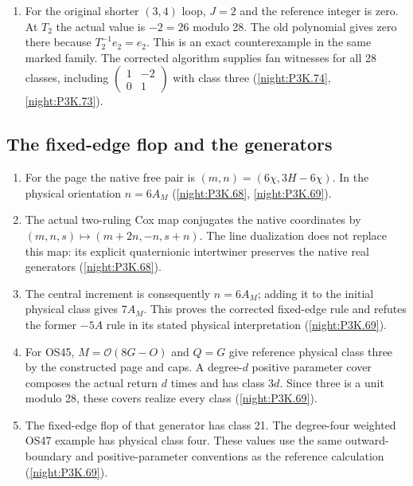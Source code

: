 \begin{enumerate}[label=\arabic*.]
  (\cref{night:P3K.73}).
\item For the original shorter $(3,4)$ loop, $J=2$ and the
  reference integer is zero.  At $T_2$ the actual value is $-2=26$
  modulo 28.  The old polynomial gives zero there because
  $T_2^{-1}e_2=e_2$.  This is an exact counterexample in the same
  marked family.  The corrected algorithm supplies fan witnesses
  for all 28 classes, including
  $\left(\begin{smallmatrix}1&-2\\0&1\end{smallmatrix}\right)$
  with class three (\cref{night:P3K.74}, \cref{night:P3K.73}).
\end{enumerate}

\subsection{The fixed-edge flop and the generators}
\RungOne
\begin{enumerate}[label=\arabic*.]
\item For the page the native free pair is
  $(m,n)=(6\chi,3H-6\chi)$.  In the physical orientation
  $n=6A_M$ (\cref{night:P3K.68}, \cref{night:P3K.69}).
\item The actual two-ruling Cox map conjugates the native
  coordinates by $(m,n,s)\mapsto(m+2n,-n,s+n)$.
  The line dualization does not replace this map: its explicit
  quaternionic intertwiner preserves the native real generators
  (\cref{night:P3K.68}).
\item The central increment is consequently $n=6A_M$; adding it
  to the initial physical class gives $7A_M$.  This proves the
  corrected fixed-edge rule and refutes the former $-5A$ rule
  in its stated physical interpretation
  (\cref{night:P3K.69}).
\item For OS45, $M=\mathcal O(8G-O)$ and $Q=G$ give reference
  physical class three by the constructed page and caps.  A
  degree-$d$ positive parameter cover composes the actual return
  $d$ times and has class $3d$.  Since three is a unit modulo 28,
  these covers realize every class
  (\cref{night:P3K.69}).
\item The fixed-edge flop of that generator has class 21.  The
  degree-four weighted OS47 example has physical class four.
  These values use the same outward-boundary and positive-parameter
  conventions as the reference calculation
  (\cref{night:P3K.69}).
\end{enumerate}

